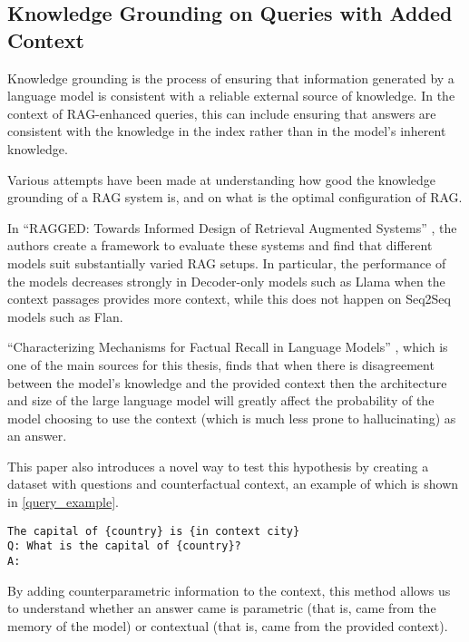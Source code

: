 \subsection{Knowledge Grounding on Queries with Added Context}

Knowledge grounding is the process of ensuring that information generated by a language model is consistent with a reliable external source of knowledge.
In the context of RAG-enhanced queries, this can include ensuring that answers are consistent with the knowledge in the index rather than in the model's inherent knowledge.

Various attempts have been made at understanding how good the knowledge grounding of a RAG system is, and on what is the optimal configuration of RAG.

In ``RAGGED: Towards Informed Design of Retrieval Augmented Systems'' \citep{ragged}, the authors create a framework to evaluate these systems and find that different models suit substantially varied RAG setups.
In particular, the performance of the models decreases strongly in Decoder-only models such as Llama when the context passages provides more context, while this does not happen on Seq2Seq models such as Flan.

``Characterizing Mechanisms for Factual Recall in Language Models'' \citep{factual_recall}, which is one of the main sources for this thesis, finds that when there is disagreement between the model's knowledge and the provided context then the architecture and size of the large language model will greatly affect the probability of the model choosing to use the context (which is much less prone to hallucinating) as an answer.

This paper also introduces a novel way to test this hypothesis by creating a dataset with questions and counterfactual context, an example of which is shown in \cref{query_example}.

\begin{lstlisting}[caption={Example of queries used in \citep{factual_recall}. These queries form the basis and inspiration for the dataset creation done in this thesis}, label={query_example},basicstyle=\ttfamily\small,keywordstyle=\rmfamily\bfseries,keywords={country,in,context,city},captionpos=b,frame=single,breaklines=true,xrightmargin=.15\textwidth,xleftmargin=.15\textwidth,float=h]
The capital of {country} is {in context city}
Q: What is the capital of {country}?
A:
\end{lstlisting}

By adding counterparametric information to the context, this method allows us to understand whether an answer came is parametric (that is, came from the memory of the model) or contextual (that is, came from the provided context).
